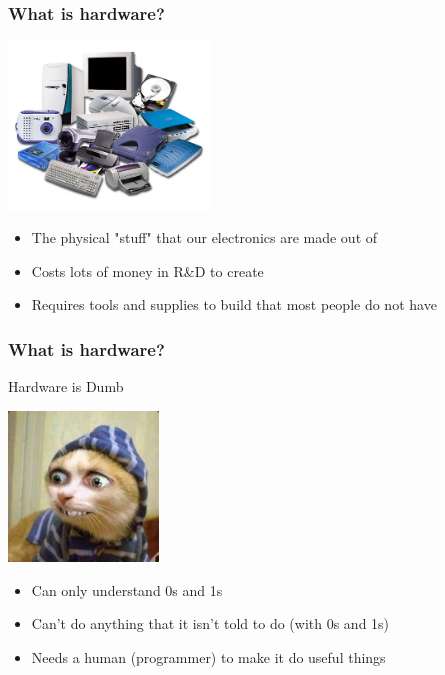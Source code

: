 \documentclass{beamer}
\begin{document}
\begin{frame}
  \frametitle{What is hardware?}
  \begin{center}
    \includegraphics[width=0.4\textwidth]{../img/hardware-2}
  \end{center}
  \begin{itemize}
  \item The physical "stuff" that our electronics are made out of
  \item Costs lots of money in R\&D to create
  \item Requires tools and supplies to build that most people do not have
  \end{itemize}
\end{frame}

\begin{frame}
  \frametitle{What is hardware?}
  \begin{center}
    \begin{Large} Hardware is Dumb \end{Large}

    \vspace{1em}
  
    \includegraphics[width=0.3\textwidth]{../img/dumb-hardware}
  \end{center}
  \begin{itemize}
  \item Can only understand 0s and 1s
  \item Can't do anything that it isn't told to do (with 0s and 1s)
  \item Needs a human (programmer) to make it do useful things
  \end{itemize}
\end{frame}
\end{document}
